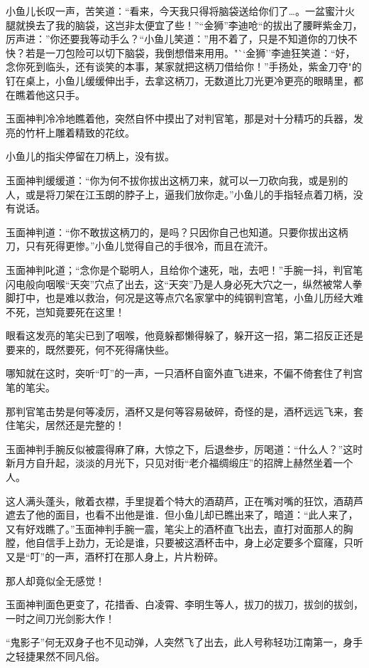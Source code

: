 \documentclass[12pt,oneside]{book}
\begin{document}
小鱼儿长叹一声，苦笑道：``看来，今天我只得将脑袋送给你们了\ldots。一盆蜜汁火腿就换去了我的脑袋，这岂非太便宜了些！''``金狮''李迪呛``的拔出了腰畔紫金刀，厉声进：''你还要我等动手么？``小鱼儿笑道：''用不着了，只是不知道你的刀快不快？若是一刀包险可以切下脑袋，我倒想借来用用。"``金狮''李迪狂笑道：``好，念你死到临头，还有谈笑的本事，某家就把这柄刀借给你！''手扬处，紫金刀夺"的钉在桌上，小鱼儿缓缓伸出手，去拿这柄刀，无数道比刀光更冷更亮的眼睛里，都在瞧着他这只手。

玉面神判冷冷地瞧着他，突然自怀中摸出了对判官笔，那是对十分精巧的兵器，发亮的竹杆上雕着精致的花纹。

小鱼儿的指尖停留在刀柄上，没有拔。

玉面神判缓缓道：``你为何不拔你拔出这柄刀来，就可以一刀砍向我，或是别的人，或是将刀架在江玉朗的脖子上，逼我们放你走。''小鱼儿的手指轻点着刀柄，没有说话。

玉面神判道：``你不敢拔这柄刀的，是吗？只因你自己也知道。只要你拔出这柄刀，只有死得更惨。''小鱼儿觉得自己的手很冷，而且在流汗。

玉面神判叱道；``念你是个聪明人，且给你个速死，咄，去吧！''手腕一抖，判官笔闪电般向咽喉``天突''穴点了出去，这``天突''乃是人身必死大穴之一，纵然被常人拳脚打中，也是难以救治，何况是这等点穴名家掌中的纯钢判宫笔，小鱼儿历经大难不死，岂知竟要死在这里！

眼看这发亮的笔尖已到了咽喉，他竟躲都懒得躲了，躲开这一招，第二招反正还是要来的，既然要死，何不死得痛快些。

哪知就在这时，突听``叮''的一声，一只酒杯自窗外直飞进来，不偏不倚套住了判宫笔的笔尖。

那判官笔击势是何等凌厉，酒杯又是何等容易破碎，奇怪的是，酒杯远远飞来，套住笔尖，居然还是完整的！

玉面神判手腕反似被震得麻了麻，大惊之下，后退叁步，厉喝道：``什么人？''这时新月方自升起，淡淡的月光下，只见对街``老介福绸缎庄''的招牌上赫然坐着一个人。

这人满头蓬头，敞着衣襟，手里提着个特大的酒葫芦，正在嘴对嘴的狂饮，酒葫芦遮去了他的面目，也看不出他是谁．但小鱼儿却已瞧出来了，暗道：``此人来了，又有好戏瞧了。''玉面神判手腕一震，笔尖上的酒杯直飞出去，直打对面那人的胸膛，他自信手上劲力，无论是谁，只要被这酒杯击中，身上必定要多个窟窿，只听又是``叮''的一声，酒杯打在那人身上，片片粉碎。

那人却竟似全无感觉！

玉面神判面色更变了，花措香、白凌霄、李明生等人，拔刀的拔刀，拔剑的拔剑，一时之间刀光剑影大作！

``鬼影子''何无双身子也不见动弹，人突然飞了出去，此人号称轻功江南第一，身手之轻捷果然不同凡俗。
\end{document}
